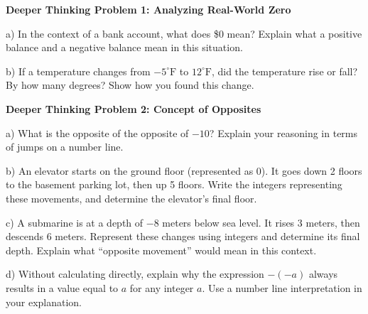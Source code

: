 \documentclass[12pt, letterpaper, fleqn]{article}
\begin{document}
\begin{tcolorbox}[colback=white, colframe=black, boxrule=1pt, arc=4mm, left=6mm, right=6mm, top=5mm, bottom=5mm]
\textbf{Deeper Thinking Problem 1: Analyzing Real-World Zero}

\medskip

\noindent
a) In the context of a bank account, what does \$0 mean? Explain what a positive balance and a negative balance mean in this situation.

\vspace{4cm}

\noindent
b) If a temperature changes from $-5^\circ\text{F}$ to $12^\circ\text{F}$, did the temperature rise or fall? By how many degrees? Show how you found this change.

\vspace{4cm}
\end{tcolorbox}
\newpage

\begin{tcolorbox}[colback=white, colframe=black, boxrule=1pt, arc=4mm, left=6mm, right=6mm, top=5mm, bottom=5mm]
\textbf{Deeper Thinking Problem 2: Concept of Opposites}

\medskip

\noindent
a) What is the opposite of the opposite of $-10$? Explain your reasoning in terms of jumps on a number line.

\vspace{3cm}

\noindent
b) An elevator starts on the ground floor (represented as 0). It goes down 2 floors to the basement parking lot, then up 5 floors. Write the integers representing these movements, and determine the elevator's final floor.

\vspace{3cm}

\noindent
c) A submarine is at a depth of $-8$ meters below sea level. It rises 3 meters, then descends 6 meters. Represent these changes using integers and determine its final depth. Explain what “opposite movement” would mean in this context.

\vspace{3.5cm}

\noindent
d) Without calculating directly, explain why the expression $-( -a )$ always results in a value equal to $a$ for any integer $a$. Use a number line interpretation in your explanation.

\vspace{4cm}
\end{tcolorbox}
\newpage
\end{document}
